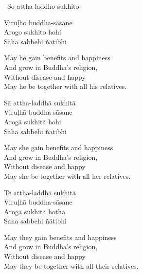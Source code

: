 \begin{pali-leader}
  \anglebracketleft\ \hspace{-0.5mm}So attha-laddho sukhito \hspace{-0.5mm}\anglebracketright\
\end{pali-leader}
\begin{pali-hangtogether}
  Viruḷho buddha-sāsane\\
  Arogo sukhito hohi\\
  Saha sabbehi ñātibhi
\end{pali-hangtogether}

\begin{english-verses}
  May he gain benefits and happiness\\
  And grow in Buddha's religion,\\
  Without disease and happy\\
  May he be together with all his relatives.
\end{english-verses}

\begin{pali-hang}
  Sā attha-laddhā sukhitā\\
  Viruḷhā buddha-sāsane\\
  Arogā sukhitā hohi\\
  Saha sabbehi ñātibhi
\end{pali-hang}

\begin{english-verses}
  May she gain benefits and happiness\\
  And grow in Buddha's religion,\\
  Without disease and happy\\
  May she be together with all her relatives.
\end{english-verses}

\begin{pali-hang}
  Te attha-laddhā sukhitā\\
  Viruḷhā buddha-sāsane\\
  Arogā sukhitā hotha\\
  Saha sabbehi ñātibhi
\end{pali-hang}

\begin{english-verses}
  May they gain benefits and happiness\\
  And grow in Buddha's religion,\\
  Without disease and happy\\
  May they be together with all their relatives.
\end{english-verses}

\suttaRef{[AN 3.155]}

